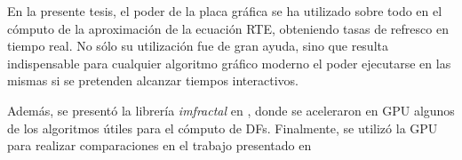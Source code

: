 En la presente tesis, el poder de la placa gráfica se ha utilizado sobre todo en el cómputo de la aproximación de la ecuación RTE, obteniendo tasas de refresco en tiempo real.
No sólo su utilización fue de gran ayuda, sino que resulta indispensable para cualquier algoritmo gráfico moderno el poder ejecutarse en las mismas si se pretenden alcanzar tiempos interactivos.

Además, se presentó la librería {\em imfractal} en \cite{Baravalle2013}, donde se aceleraron en GPU algunos de los algoritmos útiles para el cómputo de DFs.
Finalmente, se utilizó la GPU para realizar comparaciones en el trabajo presentado en \cite{Baravalle2014_2}

